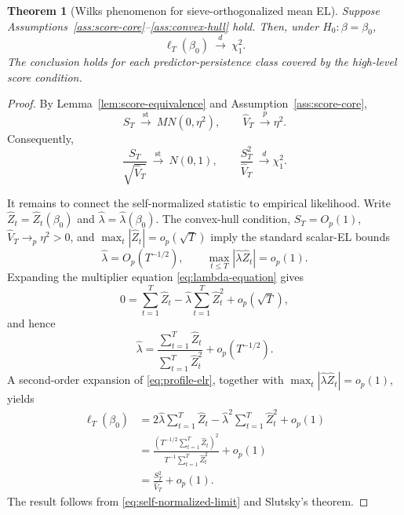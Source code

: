 \documentclass{article}
\newtheorem{theorem}{Theorem}
\begin{document}
\begin{theorem}[Wilks phenomenon for sieve-orthogonalized mean EL]
\label{thm:sieve-wilks}
Suppose Assumptions~\ref{ass:score-core}--\ref{ass:convex-hull} hold.  Then,
under \(H_0:\beta=\beta_0\),
\begin{equation}
    \ell_T(\beta_0)\ \xrightarrow{d}\ \chi_1^2.
    \label{eq:wilks-result}
\end{equation}
The conclusion holds for each predictor-persistence class covered by the high-level
score condition.
\end{theorem}

\begin{proof}
By Lemma~\ref{lem:score-equivalence} and
Assumption~\ref{ass:score-core},
\[
    S_T\ \xrightarrow{\mathrm{st}}\ MN(0,\eta^2),
    \qquad
    \widehat V_T\ \xrightarrow{p}\eta^2.
\]
Consequently,
\begin{equation}
    \frac{S_T}{\sqrt{\widehat V_T}}
       \ \xrightarrow{\mathrm{st}}\ N(0,1),
    \qquad
    \frac{S_T^2}{\widehat V_T}
       \ \xrightarrow{d}\chi_1^2.
    \label{eq:self-normalized-limit}
\end{equation}

It remains to connect the self-normalized statistic to empirical likelihood.
Write \(\widehat Z_t=\widehat Z_t(\beta_0)\) and
\(\widehat\lambda=\widehat\lambda(\beta_0)\).  The convex-hull condition,
\(S_T=O_p(1)\), \(\widehat V_T\to_p\eta^2>0\), and
\(\max_t|\widehat Z_t|=o_p(\sqrt T)\) imply the standard scalar-EL bounds
\[
    \widehat\lambda=O_p(T^{-1/2}),
    \qquad
    \max_{t\leq T}|\widehat\lambda\widehat Z_t|=o_p(1).
\]
Expanding the multiplier equation \eqref{eq:lambda-equation} gives
\[
    0=\sum_{t=1}^T\widehat Z_t
      -\widehat\lambda\sum_{t=1}^T\widehat Z_t^2
      +o_p(\sqrt T),
\]
and hence
\begin{equation}
    \widehat\lambda
       =\frac{\sum_{t=1}^T\widehat Z_t}
              {\sum_{t=1}^T\widehat Z_t^2}
        +o_p(T^{-1/2}).
    \label{eq:lambda-expansion}
\end{equation}
A second-order expansion of \eqref{eq:profile-elr}, together with
\(\max_t|\widehat\lambda\widehat Z_t|=o_p(1)\), yields
\begin{align*}
    \ell_T(\beta_0)
      &=2\widehat\lambda\sum_{t=1}^T\widehat Z_t
        -\widehat\lambda^2\sum_{t=1}^T\widehat Z_t^2+o_p(1)\\
      &=\frac{\left(T^{-1/2}\sum_{t=1}^T\widehat Z_t\right)^2}
              {T^{-1}\sum_{t=1}^T\widehat Z_t^2}
        +o_p(1)\\
      &=\frac{S_T^2}{\widehat V_T}+o_p(1).
\end{align*}
The result follows from \eqref{eq:self-normalized-limit} and Slutsky's
theorem.
\end{proof}
\end{document}
